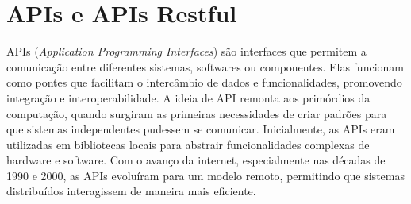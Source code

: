 


\section{APIs e APIs Restful}

APIs (\textit{Application Programming Interfaces}) são interfaces que permitem a comunicação entre diferentes sistemas, softwares ou componentes. Elas funcionam como pontes que facilitam o intercâmbio de dados e funcionalidades, promovendo integração e interoperabilidade. A ideia de API remonta aos primórdios da computação, quando surgiram as primeiras necessidades de criar padrões para que sistemas independentes pudessem se comunicar. Inicialmente, as APIs eram utilizadas em bibliotecas locais para abstrair funcionalidades complexas de hardware e software. Com o avanço da internet, especialmente nas décadas de 1990 e 2000, as APIs evoluíram para um modelo remoto, permitindo que sistemas distribuídos interagissem de maneira mais eficiente.

